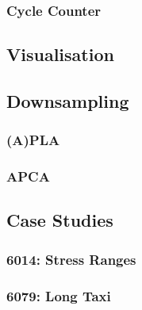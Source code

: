\subsubsection{Cycle Counter}

\subsection{Visualisation}

\subsection{Downsampling}

\subsubsection{(A)PLA}

\subsubsection{APCA}

\subsection{Case Studies}

\subsubsection{6014: Stress Ranges}

\subsubsection{6079: Long Taxi}